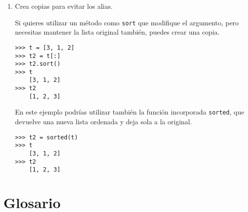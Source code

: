 \documentclass[10pt]{book}
\begin{document}
\begin{enumerate}
\item Crea copias para evitar los alias.

Si quieres utilizar un método como {\tt sort} que modifique
el argumento, pero necesitas mantener la lista original
también, puedes crear una copia.

\begin{verbatim}
>>> t = [3, 1, 2]
>>> t2 = t[:]
>>> t2.sort()
>>> t
    [3, 1, 2]
>>> t2
    [1, 2, 3]
\end{verbatim}

En este ejemplo podrías utilizar también la función incorporada {\tt sorted},
que devuelve una nueva lista ordenada y deja sola a la original.

\begin{verbatim}
>>> t2 = sorted(t)
>>> t
    [3, 1, 2]
>>> t2
    [1, 2, 3]
\end{verbatim}

\end{enumerate}



\section{Glosario}
\end{document}
